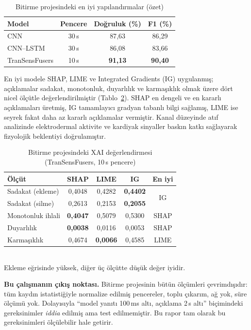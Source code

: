 \documentclass[conference]{IEEEtran}
\newcommand{\ms}{\,ms\xspace}
\begin{document}
\begin{table}[t]
\caption{Bitirme projesindeki en iyi yapılandırmalar (özet)}
\label{tab:onceki-model}
\centering
\begin{tabular}{lccc}
\toprule
\textbf{Model} & \textbf{Pencere} & \textbf{Doğruluk (\%)} & \textbf{F1 (\%)}\\
\midrule
CNN            & 30\,s & 87{,}63 & 86{,}29\\
CNN--LSTM      & 30\,s & 86{,}08 & 83{,}66\\
TranSensFusers & 10\,s & \textbf{91{,}13} & \textbf{90{,}40}\\
\bottomrule
\end{tabular}
\end{table}

En iyi modele SHAP, LIME ve Integrated Gradients (IG) uygulanmış; açıklamalar
sadakat, monotonluk, duyarlılık ve karmaşıklık olmak üzere dört nicel ölçütle
değerlendirilmiştir (Tablo~\ref{tab:onceki-xai}). SHAP en dengeli ve en kararlı
açıklamaları üretmiş, IG tamamlayıcı gradyan tabanlı bilgi sağlamış, LIME ise
seyrek fakat daha az kararlı açıklamalar vermiştir. Kanal düzeyinde atıf
analizinde elektrodermal aktivite ve kardiyak sinyaller baskın katkı sağlayarak
fizyolojik beklentiyi doğrulamıştır.

\begin{table}[t]
\caption{Bitirme projesindeki XAI değerlendirmesi (TranSensFusers, 10\,s pencere)}
\label{tab:onceki-xai}
\centering
\small
\setlength{\tabcolsep}{4pt}
\begin{tabular}{lcccc}
\toprule
\textbf{Ölçüt} & \textbf{SHAP} & \textbf{LIME} & \textbf{IG} & \textbf{En iyi}\\
\midrule
Sadakat (ekleme)   & 0{,}4048 & 0{,}4282 & \textbf{0{,}4402} & \multirow{2}{*}{IG}\\
Sadakat (silme)    & 0{,}2613 & 0{,}2153 & \textbf{0{,}2055} & \\
Monotonluk ihlali  & \textbf{0{,}4047} & 0{,}5079 & 0{,}5300 & SHAP\\
Duyarlılık         & \textbf{0{,}0038} & 0{,}0116 & 0{,}0053 & SHAP\\
Karmaşıklık        & 0{,}4674 & \textbf{0{,}0066} & 0{,}4585 & LIME\\
\bottomrule
\end{tabular}
\\[2pt]
\footnotesize Ekleme eğrisinde yüksek, diğer üç ölçütte düşük değer iyidir.
\end{table}

\textbf{Bu çalışmanın çıkış noktası.} Bitirme projesinin bütün ölçümleri
çevrimdışıdır: tüm kaydın istatistiğiyle normalize edilmiş pencereler, toplu
çıkarım, ağ yok, süre ölçümü yok. Dolayısıyla ``model yanıtı 100\ms altı,
açıklama 2\,s altı'' biçimindeki gereksinimler \emph{iddia} edilmiş ama test
edilmemiştir. Bu rapor tam olarak bu gereksinimleri ölçülebilir hale getirir.
\end{document}
